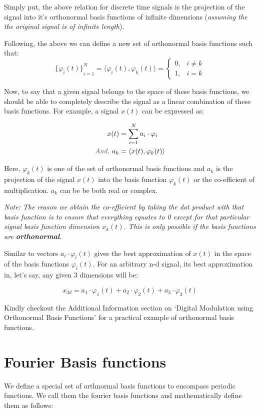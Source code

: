 \documentclass[letterpaper,12pt]{article}
\newcommand{\annot}[1]{\textcolor{darkgray}{\textit{#1}}}
\begin{document}
Simply put, the above relation for discrete time signals is the projection of
the signal into it's orthonormal basis functions of infinite dimensions
(\textit{assuming the the original signal is of infinite length}).

Following, the above we can define a new set of orthonormal basis functions
such that:
\[{\{\varphi_{i}(t)\}}^{N}_{i=1} = \langle \varphi_{i}(t), \varphi_{k}(t)\rangle = \begin{cases}
        0, & i \neq k \\
        1, & i = k
    \end{cases}
\]

Now, to say that a given signal belongs to the space of these basis functions,
we should be able to completely describe the signal as a linear combination of
these basis functions. For example, a signal $x(t)$ can be expressed as:

\begin{align*}
    x(t)              & = \sum_{i=1}^{N} a_{i} \cdot \varphi_{i} \\
    \annot{And, } a_k & = \langle x(t), \varphi_{k}(t)\rangle
\end{align*}

Here, $\varphi_{k}(t)$ is one of the set of orthonormal basis functions and
$a_{k}$ is the projection of the signal $x(t)$ into the basis function
$\varphi_{k}(t)$ or the co-efficient of multiplication. $a_{k}$ can be be both
real or complex.

\textit{Note: The reason we obtain the co-efficient by taking the dot product with that basis function is to ensure that everything equates to 0 except for that particular signal basis function dimension $x_{k}(t)$. This is only possible if the basis functions are \textbf{orthonormal}.}

Similar to vectors $a_{i} \cdot \varphi_{i}(t)$ gives the best approximation of
$x(t)$ in the space of the basis functions $\varphi_{i}(t)$. For an arbitrary
n-d signal, its best approximation in, let's say, any given 3 dimensions will
be:

\[{x}_{3d} = a_{1}\cdot \varphi_{1}(t) + a_{2}\cdot \varphi_{2}(t) + a_{3}\cdot \varphi_{3}(t)\]

Kindly checkout the Additional Information section on `Digital Modulation using
Orthonormal Basis Functions' for a practical example of orthonormal basis
functions.

\section{Fourier Basis functions}
We define a special set of orthnormal basis functions to encompass periodic
functions. We call them the fourier basis functions and mathematically define
them as follows:
\end{document}
